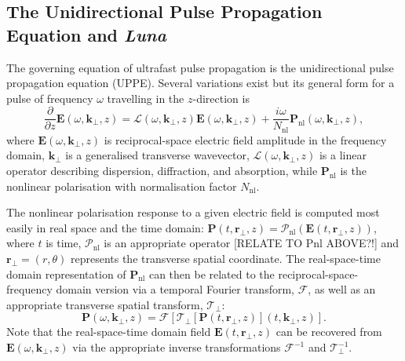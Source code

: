 \documentclass[a4paper]{jpconf}
\begin{document}
\subsection{The Unidirectional Pulse Propagation Equation and \emph{Luna} }
The governing equation of ultrafast pulse propagation is the unidirectional pulse propagation equation (UPPE). Several variations exist but its general form for a pulse of frequency $\omega$ travelling in the $z$-direction is 
\begin{equation}
\frac{\partial}{\partial z} \mathbf{E}(\omega, \mathbf{k}_\perp, z)= \mathcal{L}(\omega, \mathbf{k}_\perp, z)\mathbf{E}(\omega, \mathbf{k}_\perp, z) + \frac{i \omega}{N_{\text{nl}}} \mathbf{P}_\text{nl}(\omega, \mathbf{k}_\perp, z),
\end{equation}
where $\mathbf{E}(\omega, \mathbf{k}_\perp, z)$ is reciprocal-space electric field amplitude in the frequency domain, $\mathbf{k}_\perp$ is a generalised transverse wavevector,  $\mathcal{L}(\omega, \mathbf{k}_\perp, z)$ is a linear operator describing dispersion, diffraction, and absorption, while $\mathbf{P}_\text{nl}$ is the nonlinear polarisation with normalisation factor $N_\text{nl}$. \par 
The nonlinear polarisation response to a given electric field is computed most easily in real space and the time domain: $\mathbf{P}(t, \mathbf{r}_\perp,z) = \mathcal{P}_\text{nl}(\mathbf{E}(t,\mathbf{r}_\perp,z))$, where $t$ is time, $\mathcal{P}_\text{nl}$ is an appropriate operator [RELATE TO Pnl ABOVE?!] and $\mathbf{r}_\perp = (r, \theta)$ represents the transverse spatial coordinate. The real-space-time domain representation of $\mathbf{P}_\text{nl}$ can then be related to the reciprocal-space-frequency domain version via a temporal Fourier transform, $\mathcal{F}$, as well as an appropriate transverse spatial transform, $\mathcal{T}_\perp$:
\begin{equation}
\mathbf{P}(\omega, \mathbf{k}_\perp,z) = \mathcal{F}\left[ \mathcal{T}_\perp \left[ \mathbf{P}(t, \mathbf{r}_\perp,z) \right](t, \mathbf{k}_\perp, z)  \right]. 
\end{equation}
Note that the real-space-time domain field $\mathbf{E}(t, \mathbf{r}_\perp, z)$ can be recovered from $\mathbf{E}(\omega, \mathbf{k}_\perp, z)$ via the appropriate inverse transformations $\mathcal{F}^{-1}$ and $\mathcal{T}^{-1}_\perp$. \par 
\end{document}

